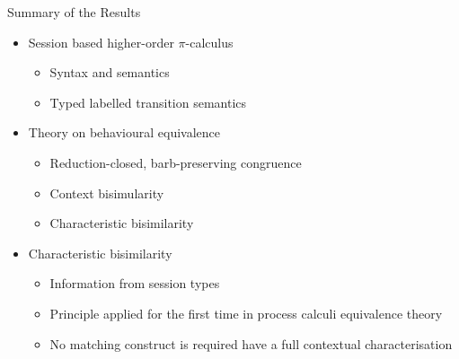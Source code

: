 \documentclass{beamer}
\begin{document}
	\begin{frame}{Summary of the Results}
		\begin{itemize}
			\item	Session based higher-order $\pi$-calculus
				\begin{itemize}
					\item	Syntax and semantics
					\item	Typed labelled transition semantics
				\end{itemize}
			\item	Theory on behavioural equivalence
				\begin{itemize}
					\item	Reduction-closed, barb-preserving congruence
					\item	Context bisimularity
					\item	Characteristic bisimilarity
				\end{itemize}

			\item	Characteristic bisimilarity
				\begin{itemize}
					\item	Information from session types
					\item	Principle applied for the first time in process calculi equivalence theory
					\item	No matching construct is required have a full contextual characterisation
				\end{itemize}
		\end{itemize}
	\end{frame}


%
%
%
	
\end{document}
